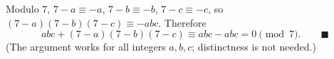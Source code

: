Modulo $7$, $7-a\equiv-a$, $7-b\equiv-b$, $7-c\equiv-c$, so $(7-a)(7-b)(7-c)\equiv-abc$. Therefore
\[
abc+(7-a)(7-b)(7-c)\equiv abc-abc=0\pmod7. \qquad\blacksquare
\]
(The argument works for all integers $a,b,c$; distinctness is not needed.)
